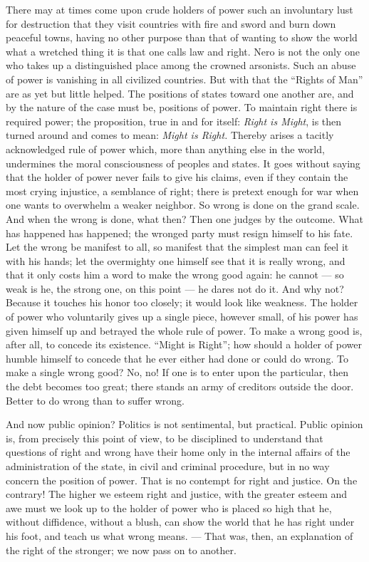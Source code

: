 \documentclass[12pt,a4paper,openany]{book}
\newcommand{\opage}[1]{\marginnote{\footnotesize\textit{[#1]}}}
\begin{document}
There may at times come upon crude holders of power such
an involuntary lust for destruction that they visit
countries with fire and sword and burn down peaceful towns,
having no other purpose than that of wanting to show
the world what a wretched thing it is that one calls law and
right. Nero is not the only one who takes up a distinguished
place among the crowned arsonists. Such an
\setcounter{footnote}{0}%
\opage{96}abuse of power is vanishing in all civilized
countries. But with that the ``Rights of Man''
are as yet but little helped. The positions of states toward one another
are, and by the nature of the case must be,
positions of power. To maintain right there is required
power; the proposition, true in and for itself: \emph{Right is Might},
is then turned around and comes to mean: \emph{Might is Right.}
Thereby arises a tacitly acknowledged rule of power
which, more than anything else in the world, undermines
the moral consciousness of peoples and states. It goes
without saying that the holder of power never fails to give
his claims, even if they contain the most
crying injustice, a semblance of right; there is pretext
enough for war when one wants to overwhelm a weaker neighbor.
So wrong is done on the grand scale. And when the wrong
is done, what then? Then one judges by the outcome.
What has happened has happened; the wronged party must
resign himself to his fate. Let the wrong be manifest
to all, so manifest that the simplest man
can feel it with his hands; let the overmighty one
himself see that it is really wrong, and that it only
costs him a word to make the wrong good again: he
cannot --- so weak is he, the strong one, on this
point --- he dares not do it. And why
not? Because it touches his honor too closely; it would
look like weakness. The holder of power who voluntarily
gives up a single piece, however small, of his
power has given himself up and betrayed the whole rule of power.
To make a wrong good is, after all, to concede
its existence. ``Might is Right''; how should a
holder of power humble himself to concede that he ever
either had done or could do wrong. To
\setcounter{footnote}{0}%
\opage{97}make a single wrong good? No, no! If one is to enter
upon the particular, then the debt becomes too great;
there stands an army of creditors outside the door. Better
to do wrong than to suffer wrong.

And now public opinion? Politics is not
sentimental, but practical. Public opinion is, from precisely this point of view,
to be disciplined to understand
that questions of right and wrong have their home only in
the internal affairs of the administration of the state, in civil and criminal procedure,
but in no way concern the position of power.
That is no contempt for right and justice. On the contrary!
The higher we esteem right and justice, with the
greater esteem and awe must we look up
to the holder of power who is placed so high that he, without
diffidence, without a blush, can show the world that he
has right under his foot, and teach us what wrong
means. --- That was, then, an explanation of the right of the stronger;
we now pass on to another.
\end{document}
